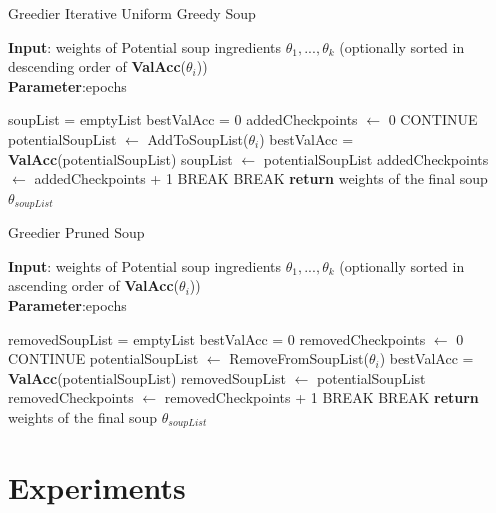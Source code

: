 \documentclass[10pt,twocolumn,letterpaper]{article}
\begin{document}
\begin{algorithm}[!htb]
\caption{Greedier Iterative Uniform Greedy Soup}
\label{alg:algorithm3}
\textbf{Input}: weights of Potential soup ingredients ${\theta_1, ..., \theta_k}$ (optionally sorted in descending order of \textbf{ValAcc}($\theta_i$))\\
\textbf{Parameter}:epochs\\
\begin{algorithmic}[1] %
\STATE soupList = emptyList
\STATE bestValAcc = 0
\STATE addedCheckpoints $\leftarrow$ 0
\STATE CONTINUE
\ENDIF
\STATE potentialSoupList $\leftarrow$ AddToSoupList($\theta_i$)
\STATE bestValAcc = \textbf{ValAcc}(potentialSoupList)
\STATE soupList $\leftarrow$ potentialSoupList
\STATE addedCheckpoints $\leftarrow$ addedCheckpoints + 1
\STATE BREAK
\ENDIF
\ENDFOR
{}
\STATE BREAK
\ENDIF
{}
\ENDWHILE
\STATE \textbf{return} weights of the final soup $\theta_{soupList}$
\end{algorithmic}
\end{algorithm}
\begin{algorithm}[!htb]
\caption{Greedier Pruned Soup}
\label{alg:algorithm4}
\textbf{Input}: weights of Potential soup ingredients ${\theta_1, ..., \theta_k}$ (optionally sorted in ascending order of \textbf{ValAcc}($\theta_i$))\\
\textbf{Parameter}:epochs\\
\begin{algorithmic}[1] %
\STATE removedSoupList = emptyList
\STATE bestValAcc = 0
\STATE removedCheckpoints $\leftarrow$ 0
\STATE CONTINUE
\ENDIF
\STATE potentialSoupList $\leftarrow$ RemoveFromSoupList($\theta_i$)
\STATE bestValAcc = \textbf{ValAcc}(potentialSoupList)
\STATE removedSoupList $\leftarrow$ potentialSoupList
\STATE removedCheckpoints $\leftarrow$ removedCheckpoints + 1
\STATE BREAK
\ENDIF
\ENDFOR
{}
\STATE BREAK
\ENDIF
{}
\ENDWHILE
\STATE \textbf{return} weights of the final soup $\theta_{soupList}$
\end{algorithmic}
\end{algorithm}
\section{Experiments}
\end{document}
